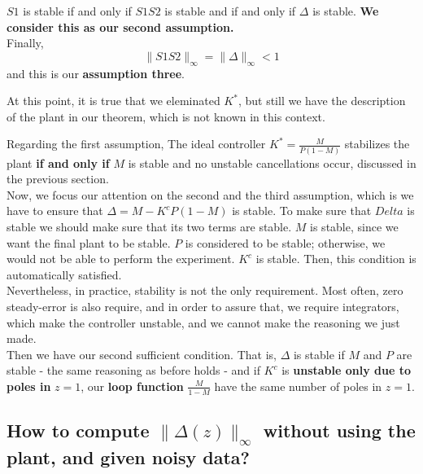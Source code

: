 $S1$ is stable if and only if $S1S2$ is stable and if and only if $\Delta$ is stable. \textbf{We consider this as our second assumption.}\\

Finally, 
\[
\|S1S2\|_\infty = \|\Delta\|_\infty < 1
\]
and this is our \textbf{assumption three}.

At this point, it is true that we eleminated $K^{*}$, but still we have the description of the plant in our theorem, which is not known in this context.


Regarding the first assumption, The ideal controller $K^{*} = \frac{M}{P(1-M)}$ stabilizes the plant \textbf{if and only if} $M$ is stable and no unstable cancellations occur, discussed in the previous section.\\
Now, we focus our attention on the second and the third assumption, which is we have to ensure that $\Delta = M - K^{c}P(1-M)$ is stable. To make sure that $Delta$ is stable we should make sure that its two terms are stable. $M$ is stable, since we want the final plant to be stable. $P$ is considered to be stable; otherwise, we would not be able to perform the experiment. $K^{c}$ is stable. Then, this condition is automatically satisfied. \\

Nevertheless, in practice, stability is not the only requirement. Most often, zero steady-error is also require, and in order to assure that, we require integrators, which make the controller unstable, and we cannot make the reasoning we just made. \\

Then we have our second sufficient condition. That is, $\Delta$ is stable if $M$ and $P$ are stable - the same reasoning as before holds - and if $K^{c}$ is \textbf{unstable only due to poles in} $z = 1$, our \textbf{loop function} $\frac{M}{1-M}$ have the same number of poles in $z = 1$.


\subsection{How to compute \(\|\Delta(z)\|_\infty\) without using the plant, and given noisy data?}

